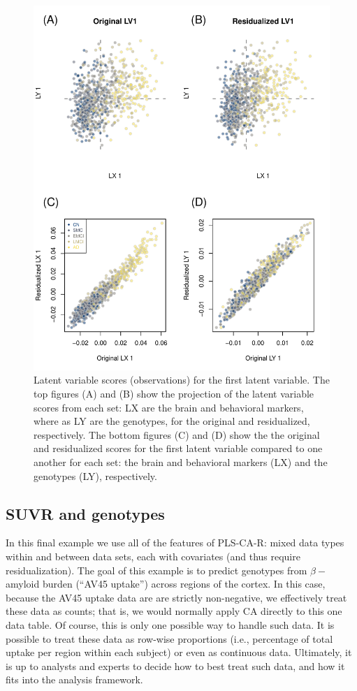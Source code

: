 \documentclass[12pt]{article}
\begin{document}
\begin{figure}[!hbtp]

{\centering \includegraphics[width=.8\textwidth,height=.8\textheight]{PLSCAR_to_a_GPLS_files/figure-latex/unnamed-chunk-11-1} 

}

\caption{\label{fig:lv_compare_ex2} Latent variable scores (observations) for the first latent variable. The top figures (A) and (B) show the projection of the latent variable scores from each set: LX are the brain and behavioral markers, where as LY are the genotypes, for the original and residualized, respectively. The bottom figures (C) and (D) show the the original and residualized scores for the first latent variable compared to one another for each set: the brain and behavioral markers (LX) and the genotypes (LY), respectively.}\label{fig:unnamed-chunk-11}
\end{figure}

\hypertarget{suvr-and-genotypes}{%
\subsection{SUVR and genotypes}\label{suvr-and-genotypes}}

\label{section:big}

In this final example we use all of the features of PLS-CA-R: mixed data
types within and between data sets, each with covariates (and thus
require residualization). The goal of this example is to predict
genotypes from \(\beta-\)amyloid burden (``AV45 uptake'') across regions
of the cortex. In this case, because the AV45 uptake data are are
strictly non-negative, we effectively treat these data as counts; that
is, we would normally apply CA directly to this one data table. Of
course, this is only one possible way to handle such data. It is
possible to treat these data as row-wise proportions (i.e., percentage
of total uptake per region within each subject) or even as continuous
data. Ultimately, it is up to analysts and experts to decide how to best
treat such data, and how it fits into the analysis framework.
\end{document}
